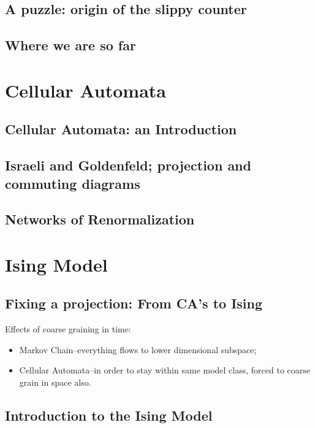 \documentclass[]{article}
\begin{document}
\subsection{A puzzle: origin of the slippy counter}

\subsection{Where we are so far}

\cite{dedeo2016conflict}

\section{Cellular Automata}

\subsection{Cellular Automata: an Introduction}

\subsection{Israeli and Goldenfeld; projection and commuting diagrams }

\subsection{Networks of Renormalization}

\cite{israeli2004computational,israeli2006coarse,dedeo2018origin}
\section{Ising Model}

\subsection{Fixing a projection: From CA’s to Ising}
Effects of coarse graining in time:
\begin{itemize}
	\item Markov Chain--everything flows to lower dimensional subspace;
	\item Cellular Automata--in order to stay within same model class, forced to coarse grain in space also.
\end{itemize}

\subsection{Introduction to the Ising Model}
\end{document}
